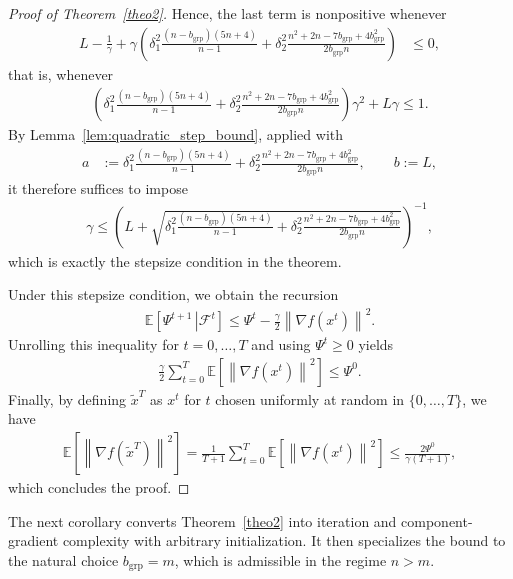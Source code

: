 \documentclass{article}
\newcommand{\bb}{\mathbb}
\newcommand{\sqn}[1]{\left\| #1 \right\|^2}
\newcommand{\eqdef}{:=}
\newcommand{\Exp}[1]{{\bb E}\left[#1\right]}
\newcommand{\Expb}[2]{\mathbb{E}\!\left[\left. #1\,\right|#2 \right]}
\newcommand{\Expc}[1]{\Expb{#1}{\mathcal{F}^t}}
\theoremstyle{plain}
\begin{document}
\begin{proof}[Proof of Theorem~\ref{theo2}]
Hence, the last term is nonpositive whenever
\begin{align*}
L-\frac{1}{\gamma}
+\gamma\left(
\delta_1^2\frac{(n-b_{\mathrm{grp}})(5n+4)}{n-1}
+\delta_2^2\frac{n^2+2n-7b_{\mathrm{grp}}+4b_{\mathrm{grp}}^2}{2b_{\mathrm{grp}}n}
\right)
&\leq 0,
\end{align*}
that is, whenever
\begin{align*}
\left(
\delta_1^2\frac{(n-b_{\mathrm{grp}})(5n+4)}{n-1}
+\delta_2^2\frac{n^2+2n-7b_{\mathrm{grp}}+4b_{\mathrm{grp}}^2}{2b_{\mathrm{grp}}n}
\right)\gamma^2
+L\gamma
\leq 1.
\end{align*}
By Lemma~\ref{lem:quadratic_step_bound}, applied with
\begin{align*}
a &\eqdef
\delta_1^2\frac{(n-b_{\mathrm{grp}})(5n+4)}{n-1}
+\delta_2^2\frac{n^2+2n-7b_{\mathrm{grp}}+4b_{\mathrm{grp}}^2}{2b_{\mathrm{grp}}n},
\qquad
b \eqdef L,
\end{align*}
it therefore suffices to impose
\begin{align*}
\gamma
\leq
\left(
L+\sqrt{
\delta_1^2\frac{(n-b_{\mathrm{grp}})(5n+4)}{n-1}
+\delta_2^2\frac{n^2+2n-7b_{\mathrm{grp}}+4b_{\mathrm{grp}}^2}{2b_{\mathrm{grp}}n}}
\right)^{-1},
\end{align*}
which is exactly the stepsize condition in the theorem.

Under this stepsize condition, we obtain the recursion
\begin{align*}
\Expc{\Psi^{t+1}}\leq \Psi^t-\frac{\gamma}{2}\sqn{\nabla f(x^t)}.
\end{align*}
Unrolling this inequality for $t=0,\ldots,T$ and using $\Psi^{t}\geq 0$ yields
\begin{align*}
\frac{\gamma}{2}\sum_{t=0}^{T}\Exp{\sqn{\nabla f(x^t)}}\leq \Psi^0.
\end{align*}
Finally, by defining $\tilde{x}^T$ as $x^t$ for $t$ chosen uniformly at random in $\{0,\ldots,T\}$, we have
\begin{align*}
\Exp{\sqn{\nabla f(\tilde{x}^T)}}=\frac{1}{T+1}\sum_{t=0}^{T}\Exp{\sqn{\nabla f(x^t)}}
\leq \frac{2\Psi^0}{\gamma(T+1)},
\end{align*}
which concludes the proof.
\end{proof}


The next corollary converts Theorem~\ref{theo2} into iteration and component-gradient complexity with arbitrary initialization.
It then specializes the bound to the natural choice $b_{\mathrm{grp}}=m$, which is admissible in the regime $n>m$.
\end{document}
